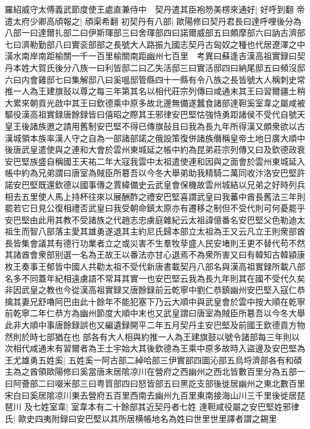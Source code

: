 羅紹威守太傅義武節度使王處直兼侍中　契丹遣其臣袍笏美楞來通好|{
	好呼到翻}
帝遣太府少卿高頎報之|{
	頎渠希翻}
初契丹有八部|{
	歐陽修曰契丹君長曰達呼哩後分為八部一曰達爾扎部二曰伊斯琿部三曰舍琿部四曰諾爾威部五曰頗摩部六曰訥古濟部七曰濟勒勤部八曰實衮部部之長號大人路振九國志契丹古匈奴之種也代居遼澤之中潢水南岸南距榆關一千一百里榆關南距幽州七百里　考異曰蘇逢吉漢高祖實録曰契丹本姓大賀氏後分八族一曰利皆邸二曰乙失活邸三曰實活邸四曰納尾邸五曰頻沒邸六曰内會雞邸七曰集解邸八曰奚嗢邸管縣四十一縣有令八族之長皆號大人稱刺史常推一人為王建旗鼔以尊之每三年第其名以相代莊宗列傳曰咸通末其王曰習爾疆土稍大累來朝貢光啟中其王曰欽德乘中原多故北邊無備遂蠶食諸部達靼奚室韋之屬咸被驅役漢高祖實録唐餘録皆曰僖昭之際其王邪律安巴堅怙強恃勇距諸侯不受代自號天皇王後諸族邀之請用舊制安巴堅不得已傳旗鼔且曰我為長九年所得漢又頗衆欲以古漢城領本族率漢人守之自為一部諸部諾之俄設策復併諸族僭稱皇帝土地日廣大順中後唐武皇遣使與之連和大會於雲州東城延之帳中約為昆弟莊宗列傳又曰及欽德政衰安巴堅族盛自稱國王天祐二年大寇我雲中太祖遣使連和因與之面會於雲州東城延入帳中約為兄弟謂曰唐室為賊臣所簒吾以今冬大舉弟助我精騎二萬同收汴洛安巴堅許諾安巴堅既還欽德以國事傳之賈緯備史云武皇會保機故雲州城結以兄弟之好時列兵相去五里使人馬上持杯往來以展酬酢之禮安巴堅喜謂武皇曰我蕃中酋長舊法三年則罷若它日見公復相禮否武皇曰我受朝命鎮太原亦有遷移之制但不受代則可何憂罷乎安巴堅由此用其教不受諸族之代趙志忠虜庭雜紀云太祖諱億番名安巴堅父色勒迪太祖生而智八部落主愛其雄勇遂退其主約尼氏歸本部立太祖為王又云凡立王則衆部酋長皆集會議其有德行功業者立之或災害不生羣牧孶盛人民安堵則王更不替代苟不然其諸酋會衆部别選一名為王故王以番法亦甘心退焉不為衆所害又曰有韓知古韓潁康枚王奏事王郁皆中國人共勸太祖不受代新唐書載契丹八部名與漢高祖實録所載八部名多不同蓋年紀相遠虜語不常耳其實一也安巴堅云我為長九年則其在國不受代久矣非因武皇之教也今從漢高祖實録又唐餘録前云乾寧中劉仁恭鎮幽州安巴堅入寇仁恭擒其妻兄舒嚕阿巴由此十餘年不能犯塞下乃云大順中與武皇會於雲中按大順在乾寧前乾寧二年仁恭方為幽州節度大順中末也又武皇謂曰唐室為賊臣所簒吾以今冬大舉此非大順中事唐餘録誤也又編遺録開平二年五月契丹主安巴堅及前國王欽德貢方物然則於時七部猶在也}
部各有大人相與約推一人為王建旗鼓以號令諸部每三年則以次相代咸通末有習爾者為王土宇始大其後欽德為王乘中原多故時入盜邊及安巴堅為王尤雄勇五姓奚|{
	五姓奚一阿古部二綽哈部三伊實部四圖沁部五烏埒濟部各有和碩主為之酋領歐陽修曰奚當唐末居隂凉川在營府之西幽州之西北皆數百里分為五部一曰阿薈部二曰啜米部三曰粤質部四曰怒皆部五曰黑訖支部後徙居幽州之東北數百里宋白曰奚居隂凉川東去營府五百里西南去幽州九百里東南接海山川三千里後徙居琵琶川}
及七姓室韋|{
	室韋本有二十餘部其近契丹者七姓}
達靼咸役屬之安巴堅姓邪律氏|{
	歐史四夷附録曰安巴堅以其所居横帳地名為姓曰世里世里譯者謂之錫里}

